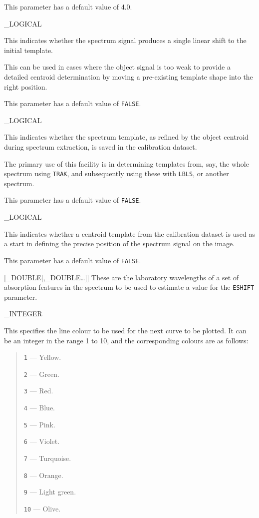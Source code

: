 {{   This parameter has a default value of 4.0.
}

{
   \_LOGICAL
}{
   This indicates whether the spectrum signal produces a single linear
   shift to the initial template.

   This can be used in cases where the object signal is too weak
   to provide a detailed centroid determination by moving a pre-existing
   template shape into the right position.

   This parameter has a default value of \verb+FALSE+\@.
}

{
   \_LOGICAL
}{
   This indicates whether the spectrum template, as refined by the
   object centroid during spectrum extraction, is saved in the calibration
   dataset.

   The primary use of this facility is in determining templates from,
   say, the whole spectrum using \verb+TRAK+, and subsequently using these
   with \verb+LBLS+, or another spectrum.

   This parameter has a default value of \verb+FALSE+\@.
}

{
   \_LOGICAL
}{
   This indicates whether a centroid template from the calibration dataset
   is used as a start in defining the precise position of the spectrum
   signal on the image.

   This parameter has a default value of \verb+FALSE+\@.
}

{
   [\_DOUBLE[,\_DOUBLE\ldots ]]
}{
   These are the laboratory wavelengths of a set of absorption features in
   the spectrum to be used to estimate a value for the \verb+ESHIFT+
   parameter.
}

{
   \_INTEGER
}{
   This specifies the line colour to be used for the next curve to be
   plotted.
   It can be an integer in the range 1 to 10, and the corresponding
   colours are as follows:

   \begin {quote}
   \begin {description}
      \item {\tt 1} --- Yellow.
      \item {\tt 2} --- Green.
      \item {\tt 3} --- Red.
      \item {\tt 4} --- Blue.
      \item {\tt 5} --- Pink.
      \item {\tt 6} --- Violet.
      \item {\tt 7} --- Turquoise.
      \item {\tt 8} --- Orange.
      \item {\tt 9} --- Light green.
      \item {\tt 10} --- Olive.
   \end {description}
   \end {quote}

}}
